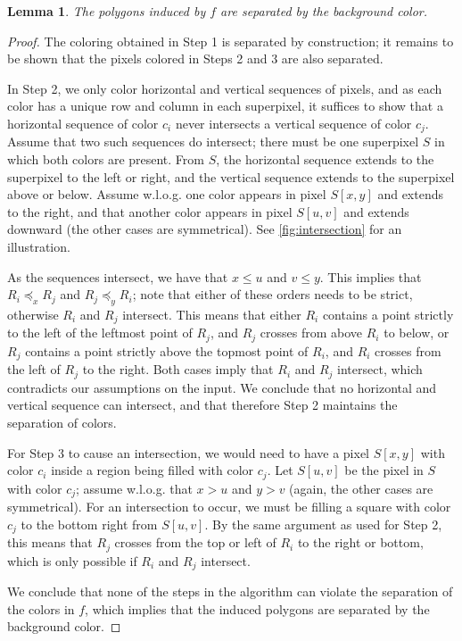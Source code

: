 \documentclass[a4paper, 11pt]{article}
\newtheorem{lemma}{Lemma}
\begin{document}
\begin{lemma}\label{lem:convex-separated}
	The polygons induced by \(f\) are separated by the background color.
\end{lemma}
\begin{proof}
	The coloring obtained in Step 1 is separated by construction; it remains to be shown that the pixels colored in Steps 2 and 3 are also separated.

	In Step 2, we only color horizontal and vertical sequences of pixels, and as each color has a unique row and column in each superpixel, it suffices to show that a horizontal sequence of color \(c_i\) never intersects a vertical sequence of color \(c_j\). Assume that two such sequences do intersect; there must be one superpixel \(S\) in which both colors are present. From \(S\), the horizontal sequence extends to the superpixel to the left or right, and the vertical sequence extends to the superpixel above or below. Assume w.l.o.g. one color appears in pixel \(S[x,y]\) and extends to the right, and that another color appears in pixel \(S[u,v]\) and extends downward (the other cases are symmetrical). See \cref{fig:intersection} for an illustration.

	As the sequences intersect, we have that \(x \leq u\) and \(v \leq y\). This implies that \(R_i \preceq_x R_j\) and \(R_j \preceq_y R_i\); note that either of these orders needs to be strict, otherwise \(R_i\) and \(R_j\) intersect. This means that either \(R_i\) contains a point strictly to the left of the leftmost point of \(R_j\), and \(R_j\) crosses from above \(R_i\) to below, or \(R_j\) contains a point strictly above the topmost point of \(R_i\), and \(R_i\) crosses from the left of \(R_j\) to the right. Both cases imply that \(R_i\) and \(R_j\) intersect, which contradicts our assumptions on the input. We conclude that no horizontal and vertical sequence can intersect, and that therefore Step 2 maintains the separation of colors.

	For Step 3 to cause an intersection, we would need to have a pixel \(S[x,y]\) with color \(c_i\) inside a region being filled with color \(c_j\). Let \(S[u,v]\) be the pixel in \(S\) with color \(c_j\); assume w.l.o.g. that \(x > u\) and \(y > v\) (again, the other cases are symmetrical). For an intersection to occur, we must be filling a square with color \(c_j\) to the bottom right from \(S[u,v]\). By the same argument as used for Step 2, this means that \(R_j\) crosses from the top or left of \(R_i\) to the right or bottom, which is only possible if \(R_i\) and \(R_j\) intersect.

	We conclude that none of the steps in the algorithm can violate the separation of the colors in \(f\), which implies that the induced polygons are separated by the background color.
\end{proof}
\end{document}
